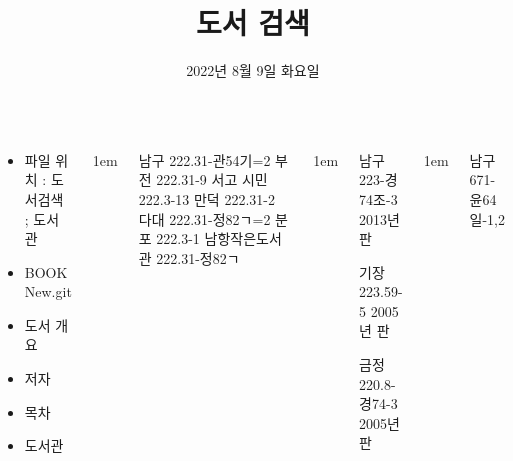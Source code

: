 \documentclass[	20pt, 
							a1paper, 
							portrait, %
							margin=0mm, %
							innermargin=10mm,  		%
							colspace=5mm, 
							subcolspace=0mm
							]{tikzposter}
\title{도서 검색}
\author{ 2022년 8월 9일 화요일  }
\begin{document}
	\maketitle

	\begin{columns}


			{
				\begin{LARGE}
			\begin{itemize}
				\item 파일 위치 : 도서검색 ; 도서관
				\item BOOK New.git
				\item 도서 개요
				\item 저자
				\item 목차
				\item 도서관
			\end{itemize}
				\end{LARGE}
			}




			{
					\setlength{\leftmargini}{7em}
					\setlength{\labelsep} {1em}
				\begin{LARGE}

남구    222.31-관54기=2 
부전   222.31-9 서고 
시민  222.3-13 
만덕  222.31-2  
다대  222.31-정82ㄱ=2 
분포  222.3-1   
남항작은도서관  222.31-정82ㄱ  
				\end{LARGE}
			}




			{
					\setlength{\leftmargini}{7em}
					\setlength{\labelsep} {1em}
				\begin{LARGE}
남구 223-경74조-3   2013년판

기장  223.59-5         2005년 판

금정  220.8-경74-3  2005년판
				\end{LARGE}
			}


			{
					\setlength{\leftmargini}{7em}
					\setlength{\labelsep} {1em}
				\begin{LARGE}
남구 671-윤64일-1,2


\end{LARGE}}
\end{columns}
\end{document}
